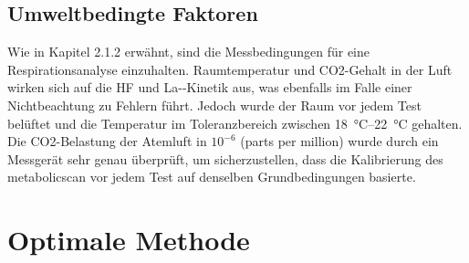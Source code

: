 \subsection{Umweltbedingte Faktoren}

Wie in Kapitel 2.1.2 erwähnt, sind die Messbedingungen für eine Respirationsanalyse einzuhalten. Raumtemperatur und \acs{CO2}-Gehalt in der Luft wirken sich auf die \acs{HF} und \acs{La-}-Kinetik aus, was ebenfalls im Falle einer Nichtbeachtung zu Fehlern führt. Jedoch wurde der Raum vor jedem Test belüftet und die Temperatur im Toleranzbereich zwischen \SIrange{18}{22}{\degreeCelsius} gehalten. Die \acs{CO2}-Belastung der Atemluft in $10^{-6}$ (parts per million) wurde durch ein Messgerät sehr genau überprüft, um sicherzustellen, dass die Kalibrierung des metabolicscan vor jedem Test auf denselben Grundbedingungen basierte.

\section{Optimale Methode}

